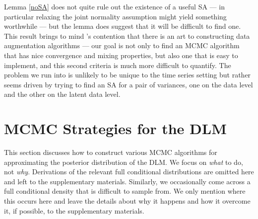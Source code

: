 \documentclass{article}
\begin{document}
Lemma \ref{noSA} does not quite rule out the existence of a useful SA --- in particular relaxing the joint normality assumption might yield something worthwhile --- but the lemma does suggest that it will be difficult to find one. This result brings to mind 's contention that there is an art to constructing data augmentation algorithms --- our goal is not only to find an MCMC algorithm that has nice convergence and mixing properties, but also one that is easy to implement, and this second criteria is much more difficult to quantify. The problem we run into is unlikely to be unique to the time series setting but rather seems driven by trying to find an SA for a pair of variances, one on the data level and the other on the latent data level.

\section{MCMC Strategies for the DLM}\label{sec:Algs}

This section discusses how to construct various MCMC algorithms for approximating the posterior distribution of the DLM. We focus on {\it what} to do, not {\it why}. Derivations of the relevant full conditional distributions are omitted here and left to the supplementary materials. Similarly, we occasionally come across a full conditional density that is difficult to sample from. We only mention where this occurs here and leave the details about why it happens and how it overcome it, if possible, to the supplementary materials.
\end{document}
